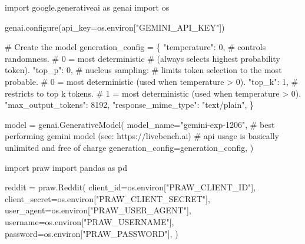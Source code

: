 \documentclass[
  letterpaper,
  DIV=11,
  numbers=noendperiod]{scrartcl}
\newenvironment{Shaded}{\begin{snugshade}}{\end{snugshade}}
\newcommand{\CommentTok}[1]{\textcolor[rgb]{0.37,0.37,0.37}{#1}}
\newcommand{\DecValTok}[1]{\textcolor[rgb]{0.68,0.00,0.00}{#1}}
\newcommand{\ImportTok}[1]{\textcolor[rgb]{0.00,0.46,0.62}{#1}}
\newcommand{\NormalTok}[1]{\textcolor[rgb]{0.00,0.23,0.31}{#1}}
\newcommand{\OperatorTok}[1]{\textcolor[rgb]{0.37,0.37,0.37}{#1}}
\newcommand{\StringTok}[1]{\textcolor[rgb]{0.13,0.47,0.30}{#1}}
\begin{document}
\begin{Shaded}
\begin{Highlighting}[]
\ImportTok{import}\NormalTok{ google.generativeai }\ImportTok{as}\NormalTok{ genai}
\ImportTok{import}\NormalTok{ os}

\NormalTok{genai.configure(api\_key}\OperatorTok{=}\NormalTok{os.environ[}\StringTok{"GEMINI\_API\_KEY"}\NormalTok{])}

\CommentTok{\# Create the model}
\NormalTok{generation\_config }\OperatorTok{=}\NormalTok{ \{}
  \StringTok{"temperature"}\NormalTok{: }\DecValTok{0}\NormalTok{,}
  \CommentTok{\# controls randomness.}
  \CommentTok{\# 0 = most deterministic}
  \CommentTok{\# (always selects highest probability token).}
  \StringTok{"top\_p"}\NormalTok{: }\DecValTok{0}\NormalTok{,}
  \CommentTok{\# nucleus sampling:}
  \CommentTok{\# limits token selection to the most probable.}
  \CommentTok{\# 0 = most deterministic (used when temperature \textgreater{} 0).}
  \StringTok{"top\_k"}\NormalTok{: }\DecValTok{1}\NormalTok{,}
  \CommentTok{\# restricts to top \textquotesingle{}k\textquotesingle{} tokens.}
  \CommentTok{\# 1 = most deterministic (used when temperature \textgreater{} 0).}
  \StringTok{"max\_output\_tokens"}\NormalTok{: }\DecValTok{8192}\NormalTok{,}
  \StringTok{"response\_mime\_type"}\NormalTok{: }\StringTok{"text/plain"}\NormalTok{,}
\NormalTok{\}}

\NormalTok{model }\OperatorTok{=}\NormalTok{ genai.GenerativeModel(}
\NormalTok{  model\_name}\OperatorTok{=}\StringTok{"gemini{-}exp{-}1206"}\NormalTok{,}
  \CommentTok{\# best performing gemini model (see: https://livebench.ai)}
  \CommentTok{\# api usage is basically unlimited and free of charge}
\NormalTok{  generation\_config}\OperatorTok{=}\NormalTok{generation\_config,}
\NormalTok{)}

\ImportTok{import}\NormalTok{ praw}
\ImportTok{import}\NormalTok{ pandas }\ImportTok{as}\NormalTok{ pd}

\NormalTok{reddit }\OperatorTok{=}\NormalTok{ praw.Reddit(}
\NormalTok{    client\_id}\OperatorTok{=}\NormalTok{os.environ[}\StringTok{"PRAW\_CLIENT\_ID"}\NormalTok{],}
\NormalTok{    client\_secret}\OperatorTok{=}\NormalTok{os.environ[}\StringTok{"PRAW\_CLIENT\_SECRET"}\NormalTok{],}
\NormalTok{    user\_agent}\OperatorTok{=}\NormalTok{os.environ[}\StringTok{"PRAW\_USER\_AGENT"}\NormalTok{],}
\NormalTok{    username}\OperatorTok{=}\NormalTok{os.environ[}\StringTok{"PRAW\_USERNAME"}\NormalTok{],}
\NormalTok{    password}\OperatorTok{=}\NormalTok{os.environ[}\StringTok{"PRAW\_PASSWORD"}\NormalTok{],}
\NormalTok{)}


\end{Highlighting}
\end{Shaded}
\end{document}
